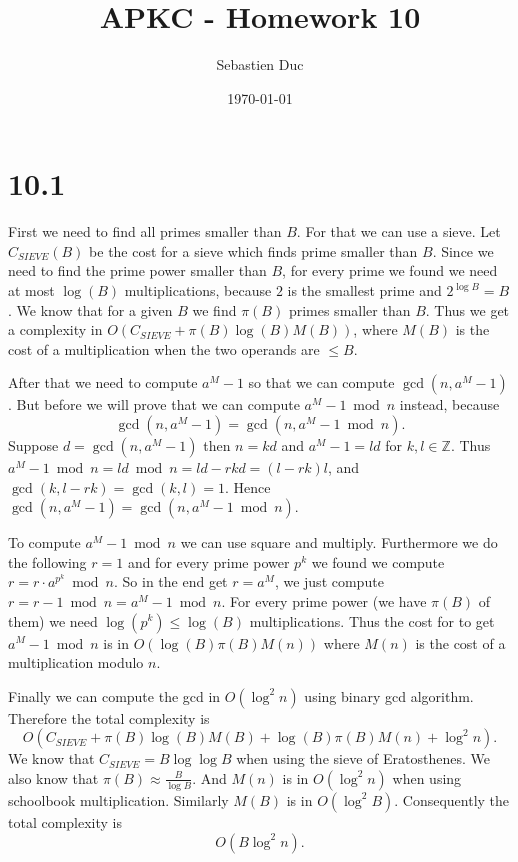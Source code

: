 \documentclass[12pt,a4paper]{article}
\title{APKC - Homework 10}
\author{Sebastien Duc}
\date{\today}
\begin{document}
\section{10.1}
First we need to find all primes smaller than $B$. For that we can use a sieve. Let $C_{SIEVE}(B)$ be the cost for a sieve which finds prime smaller than $B$.
Since we need to find the prime power smaller than $B$, for every prime we found we need at most $\log(B)$ multiplications, because $2$ is the smallest prime 
and $2^{\log B} = B$. We know that for a given $B$  we find $\pi(B)$ primes smaller than $B$. Thus we get a complexity in $O(C_{SIEVE} + \pi(B)\log(B)M(B))$, where
$M(B)$ is the cost of a multiplication when the two operands are $\leq B$. 

After that we need to compute $a^M - 1$ so that we can compute $\gcd(n,a^M -1)$.
But before we will prove that we can compute $a^M-1 \bmod n$ instead, because 
\[
    \gcd(n,a^M-1) = \gcd(n,a^M -1 \bmod n).
\]
Suppose $d = \gcd(n,a^M-1)$ then $n = kd$ and $a^M - 1 = ld$ for $k,l\in \mathbb{Z}$. Thus $a^M - 1 \bmod n = ld \bmod n = ld - rkd = (l-rk)l$,
and $\gcd(k,l-rk) = \gcd(k,l) = 1$. Hence $\gcd(n,a^M-1) = \gcd(n,a^M -1 \bmod n)$.

To compute $a^M -1 \bmod n$ we can use square and multiply. Furthermore we do the following $r = 1$ and for every prime power $p^k$ we found we compute 
$r = r \cdot a^{p^k} \bmod n$. So in the end get $r =  a^M$, we just compute $r = r-1 \bmod n = a^M -1 \bmod n$.
For every prime power (we have $\pi(B)$ of them) we need $\log(p^k) \leq \log(B)$ multiplications.
Thus the cost for to get $a^M -1 \bmod n$ is in $O(\log(B)\pi(B)M(n))$ where $M(n)$ is the cost of a multiplication modulo $n$.

Finally we can compute the gcd in $O(\log^2 n)$ using binary gcd algorithm.
Therefore the total complexity is
\[
    O(C_{SIEVE} + \pi(B)\log(B)M(B) + \log(B)\pi(B)M(n) + \log^2 n).
\]
We know that $C_{SIEVE} = B\log\log B$ when using the sieve of Eratosthenes. We also know that $\pi(B) \approx \frac{B}{\log B}$.
And $M(n)$ is in $O(\log^2 n )$ when using schoolbook multiplication. Similarly $M(B)$ is in $O(\log^2 B)$.
Consequently the total complexity is
\[
    O(B\log^2n).
\]
\end{document}
